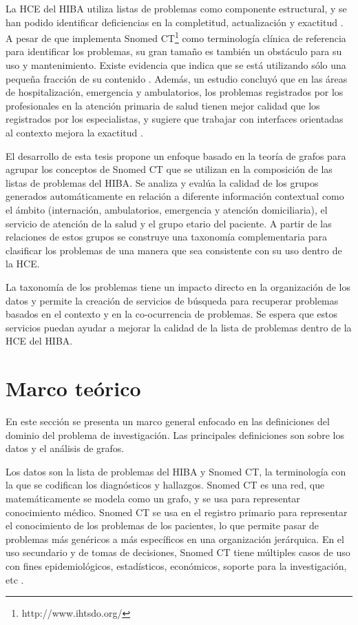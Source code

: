 La \acrfull{HCE} del \acrfull{HIBA} utiliza  listas de problemas como componente estructural, y se han podido identificar deficiencias en la completitud, actualización y exactitud \cite{Otero2014}. A pesar de que implementa Snomed CT\footnote{http://www.ihtsdo.org/} como terminología clínica de referencia para identificar los problemas, su gran tamaño es también un obstáculo para su uso y mantenimiento. Existe evidencia que indica que se está utilizando sólo una pequeña fracción de su contenido \cite{Lezcano2011}. Además, un estudio concluyó que en las áreas de hospitalización, emergencia y ambulatorios, los problemas registrados por los profesionales en la atención primaria de salud tienen mejor calidad que los registrados por los especialistas, y sugiere que trabajar con interfaces orientadas al contexto mejora la exactitud \cite{Luna2013}. 
 
El desarrollo de esta tesis propone un enfoque basado en la teoría de grafos para agrupar los conceptos de Snomed CT que se utilizan en la composición de las listas de problemas del \acrshort{HIBA}. Se analiza y evalúa la calidad de los grupos generados automáticamente en relación a diferente información contextual como el ámbito (internación, ambulatorios, emergencia y atención domiciliaria), el servicio de atención de la salud y el grupo etario del paciente. A partir de las relaciones de estos grupos se construye una taxonomía complementaria para clasificar los problemas de una manera que sea consistente con su uso dentro de la \acrshort{HCE}.
 
La taxonomía  de los problemas tiene un impacto directo en la organización de los datos y permite la creación de servicios de búsqueda para recuperar problemas basados en el contexto y en la co-ocurrencia de problemas. Se espera que estos servicios puedan ayudar a mejorar la calidad de la lista de problemas dentro de la \acrshort{HCE} del \acrshort{HIBA}.

\section{Marco teórico}
En este sección se presenta un marco general enfocado en las definiciones del dominio del problema de investigación. Las principales definiciones son sobre los datos y el análisis de grafos. 

Los datos son la lista de problemas del \acrshort{HIBA} y Snomed CT, la terminología con la que se codifican los diagnósticos y hallazgos. Snomed CT es una red, que matemáticamente se modela como un grafo, y se usa para representar conocimiento médico. Snomed CT se usa en el registro primario para representar el conocimiento de los problemas de los pacientes, lo que permite pasar de problemas más genéricos a más específicos en una organización jerárquica. En el uso secundario y de tomas de decisiones, Snomed CT tiene múltiples casos de uso con fines epidemiológicos, estadísticos, económicos, soporte para la investigación, etc \cite{Lee2014LiteratureUse}. 


